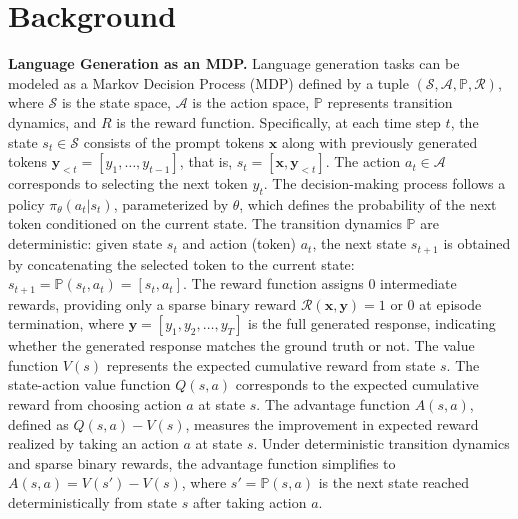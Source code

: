 \vspace{-0.2cm}
\section{Background}
\vspace{-0.2cm}

\textbf{Language Generation as an MDP.}
Language generation tasks can be modeled as a Markov Decision Process (MDP) defined by a tuple \((\mathcal{S}, \mathcal{A}, \mathbb{P}, \mathcal R)\), where \(\mathcal{S}\) is the state space, \(\mathcal{A}\) is the action space, \(\mathbb{P}\) represents transition dynamics, and \(R\) is the reward function. Specifically, at each time step \(t\), the state \(s_t \in \mathcal{S}\) consists of the prompt tokens \(\boldsymbol x\) along with previously generated tokens \(\boldsymbol y_{<t}=[y_1,\dots,y_{t-1}] \), that is, \( s_t = [\boldsymbol x, \boldsymbol y_{<t}]\). The action \(a_t \in \mathcal{A}\) corresponds to selecting the next token \(y_t\). The decision-making process follows a policy \(\pi_\theta(a_t|s_t)\), parameterized by \(\theta\), which defines the probability of the next token conditioned on the current state. The transition dynamics \(\mathbb{P}\) are deterministic: given state \( s_t \) and action (token) \( a_t \), the next state \( s_{t+1} \) is obtained by concatenating the selected token to the current state: \( s_{t+1} = \mathbb{P}(s_t, a_t) = [s_t, a_t] \). The reward function assigns 0 intermediate rewards, providing only a sparse binary reward \( \mathcal R(\boldsymbol x,\boldsymbol y) = 1 \text{ or } 0\) at episode termination, where $\boldsymbol y=[y_1, y_2, \dots, y_T]$ is the full generated response, indicating whether the generated response matches the ground truth or not. The value function \( V(s) \) represents the expected cumulative reward from state \( s \). The state-action value function \( Q(s,a) \) corresponds to the expected cumulative reward from choosing action \( a \) at state \( s \). The advantage function \( A(s,a) \), defined as \( Q(s,a)-V(s) \), measures the improvement in expected reward realized by taking an action \( a \) at state \( s \). Under deterministic transition dynamics and sparse binary rewards, the advantage function simplifies to \( A(s,a)=V(s')-V(s)\), where \( s' = \mathbb{P}(s,a) \) is the next state reached deterministically from state \( s \) after taking action \( a \).

